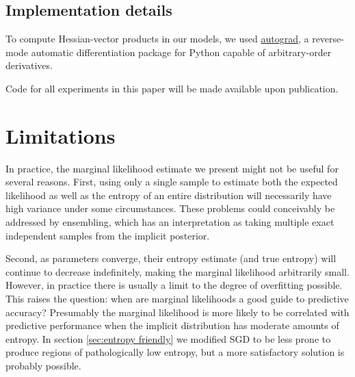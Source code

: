 \documentclass[]{article}
\begin{document}
\subsection{Implementation details}
To compute Hessian-vector products in our models, we used \href{http://github.com/HIPS/autograd}{autograd},
a reverse-mode automatic differentiation package for Python capable of arbitrary-order derivatives.

Code for all experiments in this paper will be made available upon publication.

\section{Limitations}
\label{sec:limitations}
In practice, the marginal likelihood estimate we present might not be useful for several reasons.
First, using only a single sample to estimate both the expected likelihood as well as the entropy of an entire distribution will necessarily have high variance under some circumstances.
These problems could conceivably be addressed by ensembling, which has an interpretation as taking multiple exact independent samples from the implicit posterior.

Second, as parameters converge, their entropy estimate (and true entropy) will continue to decrease indefinitely, making the marginal likelihood arbitrarily small.
However, in practice there is usually a limit to the degree of overfitting possible.
This raises the question: when are marginal likelihoods a good guide to predictive accuracy?
Presumably the marginal likelihood is more likely to be correlated with predictive performance when the
implicit distribution has moderate amounts of entropy.
In section \ref{sec:entropy friendly} we modified SGD to be less prone to produce regions of pathologically low entropy, but a more satisfactory solution is probably possible.
\end{document}
